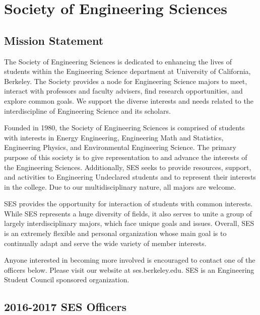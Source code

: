 \chapter*{Society of Engineering Sciences}

\textit{}

\section*{Mission Statement}

The Society of Engineering Sciences is dedicated to enhancing the lives of students within the Engineering Science department at University of California, Berkeley. The Society provides a node for Engineering Science majors to meet, interact with professors and faculty advisers, find research opportunities, and explore common goals. We support the diverse interests and needs related to the interdiscipline of Engineering Science and its scholars.

Founded in 1980, the Society of Engineering Sciences is comprised of students with interests in Energy Engineering, Engineering Math and Statistics, Engineering Physics, and Environmental Engineering Science. The primary purpose of this society is to give representation to and advance the interests of the Engineering Sciences. Additionally, SES seeks to provide resources, support, and activities to Engineering Undeclared students and to represent their interests in the college. Due to our multidisciplinary nature, all majors are welcome.

SES provides the opportunity for interaction of students with common interests. While SES represents a huge diversity of fields, it also serves to unite a group of largely interdisciplinary majors, which face unique goals and issues. Overall, SES is an extremely flexible and personal organization whose main goal is to continually adapt and serve the wide variety of member interests.

Anyone interested in becoming more involved is encouraged to contact one of the officers below. Please visit our website at ses.berkeley.edu. SES is an Engineering Student Council sponsored organization.

\section*{2016-2017 SES Officers}

